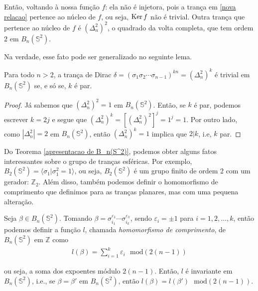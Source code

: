 	\par\vspace{0.3cm} Então, voltando à nossa função $f$: ela não é injetora, pois a trança em \eqref{nova relacao} pertence ao núcleo de $f$, ou seja, $\operatorname{Ker} f$ não é trivial. Outra trança que pertence ao núcleo de $f$ é $\displaystyle{(\Delta_n^2)^2}$, o quadrado da volta completa, que tem ordem $2$ em $B_n(\mathbb{S}^2)$.
	\par\vspace{0.3cm} Na verdade, esse fato pode ser generalizado no seguinte lema.
	
	\begin{lemma}
		\label{potencia da volta completa trivial}
		Para todo $n> 2$, a trança de Dirac $\delta = (\sigma_1\sigma_2\cdots\sigma_{n-1})^{kn} = (\Delta_n^2)^k$ é trivial em $B_n(\mathbb{S}^2)$ se, e só se, $k$ é par. 
	\end{lemma}
	
	\begin{proof}
		Já sabemos que $(\Delta_n^2)^2 = 1$ em $B_n(\mathbb{S}^2)$. Então, se $k$ é par, podemos escrever $k=2j$ e segue que $(\Delta_n^2)^k = [(\Delta_n^2)^2]^j = 1^j = 1$. Por outro lado, como $|\Delta_n^2| = 2$ em $B_n(\mathbb{S}^2)$, então $(\Delta_n^2)^k = 1$ implica que $2|k$, i.e, $k$ par.
	\end{proof}
	\par\vspace{0.3cm} Do Teorema \eqref{apresentacao de B_n(S^2)}, podemos obter alguns fatos interessantes sobre o grupo de tranças esféricas. Por exemplo, $B_2(\mathbb{S}^2) = \langle \sigma_1|\sigma_1^2=1 \rangle$, ou seja, $B_2(\mathbb{S}^2)$ é um grupo finito de ordem $2$ com um gerador: $\mathbb{Z}_2$. Além disso, também podemos definir o homomorfismo de comprimento que definimos para as tranças planares, mas com uma pequena alteração.
	
	\begin{prop}
		\label{homomorfismo de comprimento em trancas esfericas}
		Seja $\beta\in B_n(\mathbb{S}^2)$. Tomando $\beta = \sigma_{i_1}^{\varepsilon_1}\cdots\sigma_{i_k}^{\varepsilon_k}$, sendo $\varepsilon_i = \pm1$ para $i=1,2,\dots,k$, então podemos definir a função $l$, chamada \textit{homomorfismo de comprimento}, de $B_n(\mathbb{S}^2)$ em $\mathbb{Z}$ como	
		\begin{align*}
		l(\beta) = \sum_{i=1}^{k}\varepsilon_i\text{ }\mathrm{mod}(2(n-1))
		\end{align*}
		\par\vspace{0.3cm} ou seja, a soma dos expoentes módulo $2(n-1)$. Então, $l$ é invariante em $B_n(\mathbb{S}^2)$, i.e., se $\beta = \beta'$ em $B_n(\mathbb{S}^2)$, então $l(\beta) = l(\beta')\text{ }\mathrm{mod}(2(n-1))$.
	\end{prop}
	
